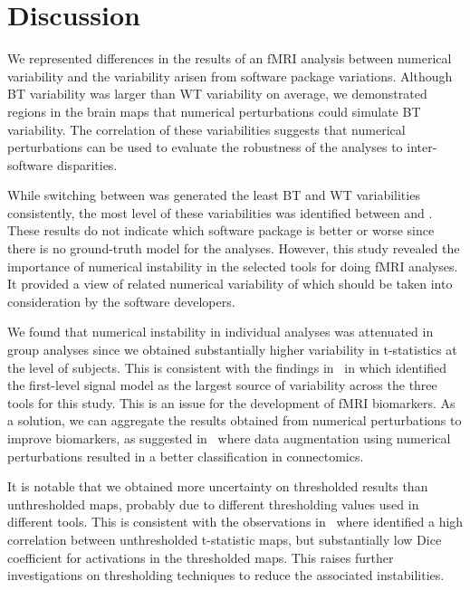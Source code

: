 \documentclass[conference]{IEEEtran}
\begin{document}
\section{Discussion}

We represented differences in the results of an fMRI analysis between numerical variability
and the variability arisen from software package variations.
Although BT variability was larger than WT variability on average,
we demonstrated regions in the brain maps that numerical perturbations could simulate BT variability.
The correlation of these variabilities suggests that numerical perturbations can be used to evaluate the robustness of the analyses
to inter-software disparities.

While switching between \fslspm was generated the least BT and WT variabilities consistently, the most level of these variabilities was identified
between \fslafni and \afnispm. %
These results do not indicate which software package is better or worse since there is no ground-truth model for the analyses.
However, this study revealed the importance of numerical instability in the selected tools for doing fMRI analyses.
It provided a view of related numerical variability of which should be taken into consideration by the software developers.

We found that numerical instability in individual analyses was attenuated in group analyses
since we obtained substantially higher variability in t-statistics at the level of subjects.
This is consistent with the findings in~\cite{bowring2021isolating} in which identified the first-level signal model as the largest
source of variability across the three tools for this study.
This is an issue for the development of fMRI biomarkers.
As a solution, we can aggregate the results obtained from numerical perturbations to improve biomarkers,
as suggested in~\cite{kiar2020numerical} where data augmentation using numerical perturbations resulted in a better classification in connectomics.

It is notable that we obtained more uncertainty on thresholded results than unthresholded maps, %
probably due to different thresholding values used in different tools.
This is consistent with the observations in~\cite{bowring2021isolating} where identified a high correlation between unthresholded t-statistic maps,
but substantially low Dice coefficient for activations in the thresholded maps.
This raises further investigations on thresholding techniques to reduce the associated instabilities.
\end{document}
